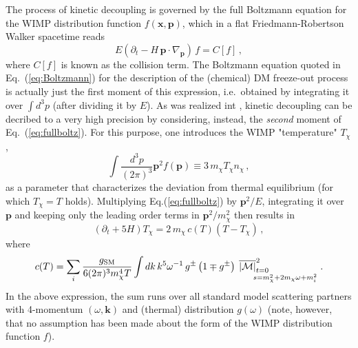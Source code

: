 The process of kinetic decoupling is governed by the full Boltzmann equation for the WIMP 
distribution function $f(\mathbf{x},\mathbf{p})$, which in 
a flat Friedmann-Robertson Walker spacetime reads
\begin{equation}
  \label{eq:fullboltz}
  E(\partial_t-H\,\mathbf{p}\cdot\nabla_\mathbf{p})\,f=C[f]\,,
\end{equation}
where $C[f]$ is known as the collision term.
The Boltzmann equation quoted in Eq.~(\ref{eq:Boltzmann}) for the description of 
the (chemical) DM freeze-out process is actually just the first moment of 
this expression, i.e.~obtained by integrating it over $\int d^3p$ (after dividing it by $E$). 
As was realized int \cite{Bringmann:2006mu,Bringmann:2009vf}, kinetic decoupling can be decribed to a very high precision 
by considering, instead, the \emph{second} moment of Eq.~(\ref{eq:fullboltz}). For this purpose,
one introduces the WIMP "temperature" $T_\chi$,
\begin{equation}
  \int\frac{d^3p}{(2\pi)^3}\mathbf{p}^2f(\mathbf{p})\equiv3\,m_\chi T_\chi n_\chi\,,
\end{equation}
as a parameter that characterizes the deviation from thermal equilibrium (for which 
$T_\chi=T$ holds). Multiplying Eq.(\ref{eq:fullboltz}) by $\mathbf{p}^2/E$, integrating it 
over $\mathbf{p}$ and keeping only the leading order terms in $\mathbf{p}^2/m_\chi^2$ 
then results in \cite{Bringmann:2009vf}
\begin{equation}
  \label{eq:boltz2}
  \left(\partial_t+5H\right)T_\chi=2\,m_\chi\, c(T)\left(T-T_\chi\right)\,,
\end{equation}
where
\begin{equation}
  \label{eq:cTdef}
  c(T) =  \sum_i\frac{g_\mathrm{SM}}{6(2\pi)^3m_\chi^4T} \int dk\,k^5 \omega^{-1}\,
        g^\pm\left(1\mp g^\pm\right)\mathop{\hspace{-11ex}
        \overline{\left|\mathcal{M}\right|}^2_{t=0}}_{\hspace{4ex}s=m_\chi^2+
                   2m_\chi\omega+m_i^2}\,.
\end{equation}
In the above expression, the sum runs over all standard model scattering partners with 
4-momentum $(\omega,\mathbf{k})$ and (thermal) distribution $g(\omega)$ (note, however, that no 
assumption has been made about the form of the WIMP distribution function $f$).

